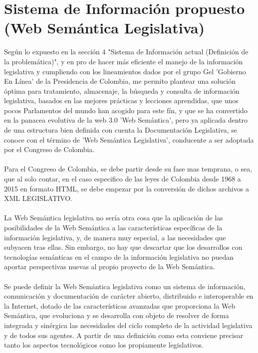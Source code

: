 \documentclass[conference]{IEEEtran}\usepackage[]{graphicx}\usepackage[]{color}
\begin{document}
\section{Sistema de Información propuesto (Web Semántica Legislativa)}
Según lo expuesto en la sección 4 "Sistema de Información actual (Definición de la problemática)", y en pro de hacer más eficiente el manejo de la información legislativa y cumpliendo con los lineamientos dados por el grupo Gel 'Gobierno En Línea' de la Presidencia de Colombia,  me permito plantear una solución óptima para tratamiento, almacenaje, la búsqueda y consulta de información legislativa, basados en las mejores prácticas y lecciones aprendidas, que unos pocos Parlamentos del mundo han acogido para este fín, y que se ha convertido en la panacea evolutiva de la web 3.0 'Web Semántica', pero ya aplicada dentro de una estructura bien definida con cuenta la Documentación Legislativa, se conoce con el término de 'Web Semántica Legislativa', conducente a ser adoptada por el Congreso de Colombia. \\ \\ 
Para el Congreso de Colombia, se debe partir desde su fase mas temprana, o sea, que al solo contar, en el caso especifico de las leyes de Colombia desde 1968 a 2015 en formato HTML, se debe empezar por la conversión de dichos archivos a XML LEGISLATIVO.\\ \\
La Web Semántica legislativa no sería otra cosa que la aplicación de las posibilidades de la Web Semántica a las características específicas de la información legislativa, y, de manera muy especial, a las necesidades que subyacen tras ellas. Sin embargo, no hay que descartar que los desarrollos con tecnologías semánticas en el campo de la información legislativa no puedan aportar perspectivas nuevas al propio proyecto de la Web Semántica.\\ \\
Se puede definir la Web Semántica legislativa como un sistema de información, comunicación y documentación de carácter abierto, distribuido e interoperable en la Internet, dotado de las características avanzadas que proporciona la Web Semántica, que evoluciona y se desarrolla con objeto de resolver de forma integrada y sinérgica las necesidades del ciclo completo de la actividad legislativa y de todos sus agentes. A partir de una definición como esta conviene precisar tanto los aspectos tecnológicos como los propiamente legislativos.

\end{document}
